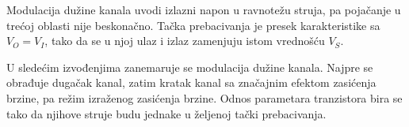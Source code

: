 Modulacija dužine kanala uvodi izlazni napon u ravnotežu struja, pa pojačanje u trećoj oblasti nije beskonačno. Tačka prebacivanja je presek karakteristike sa $V_O=V_I$, tako da se u njoj ulaz i izlaz zamenjuju istom vrednošću $V_S$.

U sledećim izvođenjima zanemaruje se modulacija dužine kanala. Najpre se obrađuje dugačak kanal, zatim kratak kanal sa značajnim efektom zasićenja brzine, pa režim izraženog zasićenja brzine. Odnos parametara tranzistora bira se tako da njihove struje budu jednake u željenoj tački prebacivanja.
